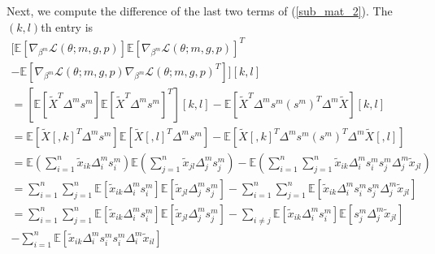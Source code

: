 \documentclass[12pt]{article}
\begin{document}
\begin{appendices}
\begin{refsection}
		Next, we compute the difference of the last two terms of (\ref{sub_mat_2}). The $(k,l)$th entry is
		\begin{multline*}
		\bigg[ \mathbb{E} \left[ \nabla_{\beta^m} \mathcal{L}(\theta; m, g, p) \right] \mathbb{E} \left[ \nabla_{\beta^m} \mathcal{L}(\theta; m, g, p) \right]^T \\ - \mathbb{E} \left[\nabla_{\beta^m} \mathcal{L}(\theta; m, g, p) \nabla_{\beta^m} \mathcal{L}(\theta; m, g, p)^T \right] \bigg] [k,l] \\ 
		= \left[ \mathbb{E} \left[\tilde{X}^T \Delta^m s^m \right] \mathbb{E} \left[\tilde{X}^T \Delta^m s^m \right]^T\right][k,l] - \mathbb{E} \left[\tilde{X}^T \Delta^m s^m (s^m)^T \Delta^m \tilde{X} \right][k,l] \\
		= \mathbb{E}\left[ \tilde{X}[,k]^T \Delta^m s^m \right] \mathbb{E} \left[ \tilde{X}[,l]^T \Delta^m s^m \right] - \mathbb{E} \left[ \tilde{X}[,k]^T \Delta^m s^m (s^m)^T \Delta^m \tilde{X}[,l ] \right] \\ 
		=\mathbb{E}\left(\sum_{i=1}^n \tilde{x}_{ik} \Delta^m_i s^m_{i} \right) \mathbb{E} \left( \sum_{j=1}^n \tilde{x}_{jl} \Delta^m_j s^m_j \right) - \mathbb{E} \left( \sum_{i=1}^n \sum_{j=1}^n \tilde{x}_{ik} \Delta^m_i s^m_i s^m_j \Delta^m_j \tilde{x}_{jl} \right) \\
		= \sum_{i=1}^n \sum_{j=1}^n \mathbb{E}[ \tilde{x}_{ik} \Delta^m_is^m_i] \mathbb{E} [\tilde{x}_{jl} \Delta^m_j s^m_j]  -  \sum_{i=1}^n \sum_{j=1}^n \mathbb{E} [ \tilde{x}_{ik} \Delta^m_i s^m_i s^m_j \Delta^m_j \tilde{x}_{jl}] \\
		= \sum_{i=1}^n \sum_{j=1}^n \mathbb{E}[ \tilde{x}_{ik} \Delta^m_i s^m_i] \mathbb{E} \left[\tilde{x}_{jl} \Delta^m_j s^m_j \right]  - \sum_{i \neq j} \mathbb{E} [ \tilde{x}_{ik} \Delta^m_i s^m_i] \mathbb{E}[s^m_j \Delta^m_j \tilde{x}_{jl}] \\ - \sum_{i=1}^n \mathbb{E}[\tilde{x}_{ik} \Delta^m_i s^m_i s^m_i \Delta^m_i \tilde{x}_{il}] \\ 

\end{multline*}
\end{refsection}
\end{appendices}
\end{document}
